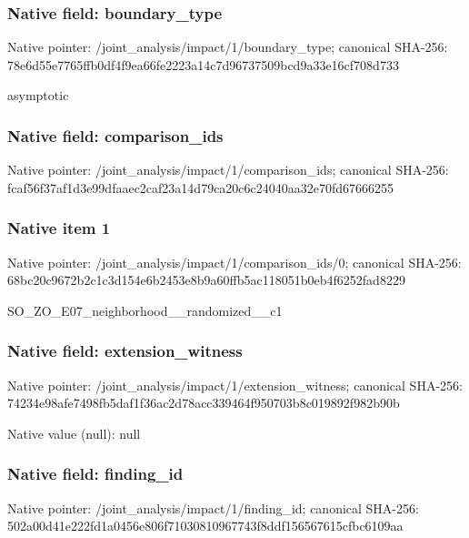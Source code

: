 \documentclass[10pt,a4paper]{article}
\begin{document}
\subsubsection{Native field: boundary\_\allowbreak{}type}
Native pointer: /joint\_\allowbreak{}analysis/impact/1/boundary\_\allowbreak{}type; canonical SHA-256: 78e6d55e7765ffb0df4f9ea66fe2223a14c7d96737509bcd9a33e16cf708d733

\begingroup\raggedright\sloppy asymptotic\par\endgroup

\subsubsection{Native field: comparison\_\allowbreak{}ids}
Native pointer: /joint\_\allowbreak{}analysis/impact/1/comparison\_\allowbreak{}ids; canonical SHA-256: fcaf56f37af1d3e99dfaaec2caf23a14d79ca20c6c24040aa32e70fd67666255

\subsubsection{Native item 1}
Native pointer: /joint\_\allowbreak{}analysis/impact/1/comparison\_\allowbreak{}ids/0; canonical SHA-256: 68bc20c9672b2c1c3d154e6b2453e8b9a60ffb5ac118051b0eb4f6252fad8229

\begingroup\raggedright\sloppy SO\_\allowbreak{}ZO\_\allowbreak{}E07\_\allowbreak{}neighborhood\_\allowbreak{}\_\allowbreak{}randomized\_\allowbreak{}\_\allowbreak{}c1\par\endgroup

\subsubsection{Native field: extension\_\allowbreak{}witness}
Native pointer: /joint\_\allowbreak{}analysis/impact/1/extension\_\allowbreak{}witness; canonical SHA-256: 74234e98afe7498fb5daf1f36ac2d78acc339464f950703b8c019892f982b90b

Native value (null): null

\subsubsection{Native field: finding\_\allowbreak{}id}
Native pointer: /joint\_\allowbreak{}analysis/impact/1/finding\_\allowbreak{}id; canonical SHA-256: 502a00d41e222fd1a0456e806f71030810967743f8ddf156567615cfbc6109aa
\end{document}
